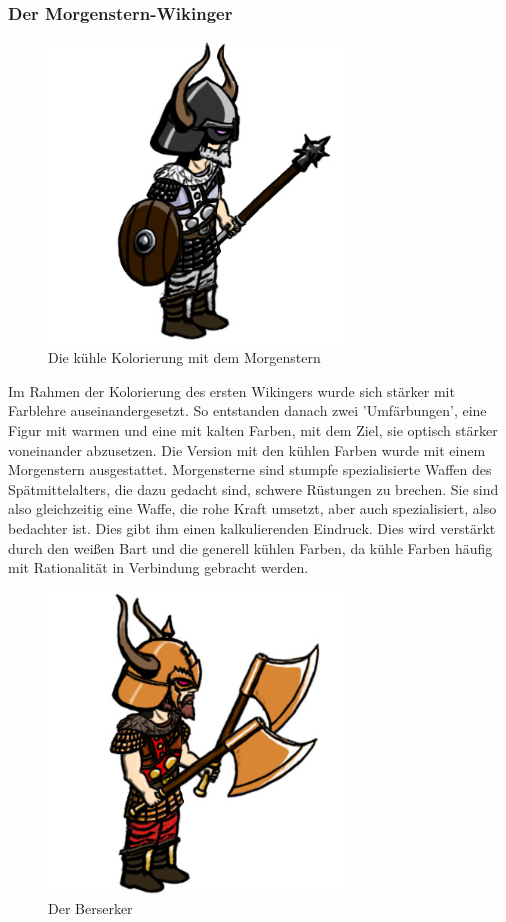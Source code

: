 \documentclass[extern,palatino]{cgBA}
\begin{document}
\newpage
\subsubsection{Der Morgenstern-Wikinger}
\begin{figure}[H]
	\centering
	\includegraphics[height=8cm]{morningstar.jpg}
	\caption{Die kühle Kolorierung mit dem Morgenstern}
	\label{morningstar}
\end{figure}
Im Rahmen der Kolorierung des ersten Wikingers wurde sich stärker mit Farblehre auseinandergesetzt. So entstanden danach zwei 'Umfärbungen', eine Figur mit warmen und eine mit kalten Farben, mit dem Ziel, sie optisch stärker voneinander abzusetzen. Die Version mit den kühlen Farben wurde mit einem Morgenstern ausgestattet. Morgensterne sind stumpfe spezialisierte Waffen des Spätmittelalters, die dazu gedacht sind, schwere Rüstungen zu brechen\cite{morg}. Sie sind also gleichzeitig eine Waffe, die rohe Kraft umsetzt, aber auch spezialisiert, also bedachter ist. Dies gibt ihm einen kalkulierenden Eindruck. Dies wird verstärkt durch den weißen Bart und die generell kühlen Farben, da kühle Farben häufig mit Rationalität in Verbindung gebracht werden\cite{color1}.
\newpage
\begin{figure}[H]
	\centering
	\includegraphics[height=8cm]{berserker.jpg}
	\caption{Der Berserker}
	\label{berserker} 
\end{figure}
\end{document}
